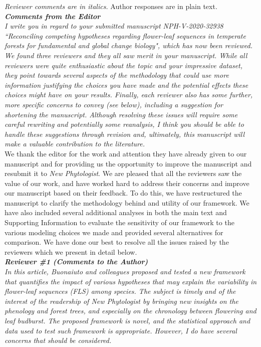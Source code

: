 \documentclass{article}[11pt]
\begin{document}
\setlength\parindent{0pt}



\emph{Reviewer comments are in italics.} Author responses are in plain text.\\

\emph{{\bf Comments from the Editor}}\\

\emph{I write you in regard to your submitted manuscript NPH-V-2020-32938 ``Reconciling competing hypotheses regarding flower-leaf sequences in temperate forests for fundamental and global change biology", which has now been reviewed. We found three reviewers and they all saw merit in your manuscript. While all reviewers were quite enthusiastic about the topic and your impressive dataset, they point towards several aspects of the methodology that could use more information justifying the choices you have made and the potential effects these choices might have on your results. Finally, each reviewer also has some further, more specific concerns to convey (see below), including a suggestion for shortening the manuscript. Although resolving these issues will require some careful rewriting and potentially some reanalysis, I think you should be able to handle these suggestions through revision and, ultimately, this manuscript will make a valuable contribution to the literature.}\\

We thank the editor for the work and attention they have already given to our manuscript and for providing us the opportunity to improve the manuscript and resubmit it to \emph{New Phytologist}. We are pleased that all the reviewers saw the value of our work, and have worked hard to address their concerns and improve our manuscript based on their feedback. To do this, we have restructured the manuscript to clarify the methodology behind and utility of our framework. We have also included several additional analyses in both the main text and Supporting Information to evaluate the sensitivity of our framework to the various modeling choices we made and provided several alternatives for comparison. We have done our best to resolve all the issues raised by the reviewers which we present in detail below.\\

\emph{{\bf Reviewer \#1 (Comments to the Author)}}\\

\emph{In this article, Buonaiuto and colleagues proposed and tested a new framework that quantifies the impact of various hypotheses that may explain the variability in flower-leaf sequences (FLS) among species. The subject is timely and of the interest of the readership of New Phytologist by bringing new insights on the phenology and forest trees, and especially on the chronology between flowering and leaf budburst. The proposed framework is novel, and the statistical approach and data used to test such framework is appropriate. However, I do have several concerns that should be considered.}\\
\end{document}
